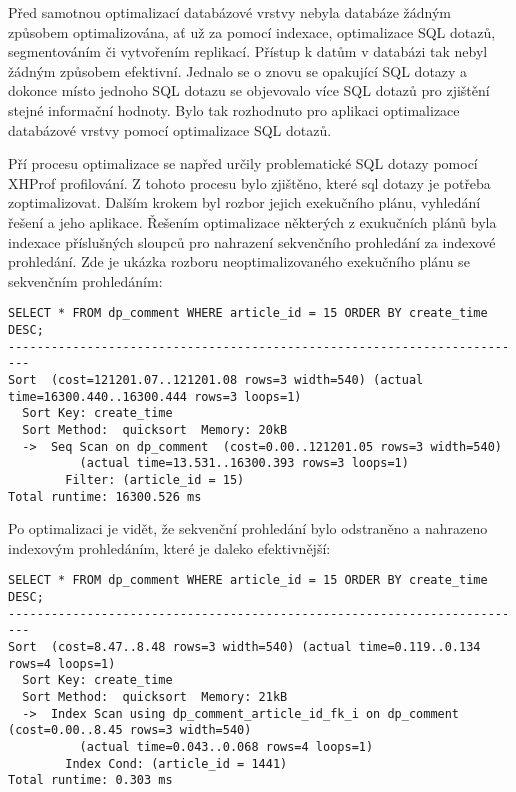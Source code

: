 \documentclass[12pt]{article}
\begin{document}
\label{sec:optim-database}
Před samotnou optimalizací databázové vrstvy nebyla databáze žádným způsobem optimalizována, ať už za pomocí indexace, optimalizace SQL dotazů, segmentováním či vytvořením replikací. Přístup k datům v databázi tak nebyl žádným způsobem efektivní. Jednalo se o znovu se opakující SQL dotazy a dokonce místo jednoho SQL dotazu se objevovalo více SQL dotazů pro zjištění stejné informační hodnoty. Bylo tak rozhodnuto pro aplikaci optimalizace databázové vrstvy pomocí optimalizace SQL dotazů.

Pří procesu optimalizace se napřed určily problematické SQL dotazy pomocí XHProf profilování. Z tohoto procesu bylo zjištěno, které sql dotazy je potřeba zoptimalizovat. Dalším krokem byl rozbor jejich exekučního plánu, vyhledání řešení a jeho aplikace. Řešením optimalizace některých z exukučních plánů byla indexace příslušných sloupců pro nahrazení sekvenčního prohledání za indexové prohledání. Zde je ukázka rozboru neoptimalizovaného exekučního plánu se sekvenčním prohledáním:

\begin{scriptsize}
\begin{verbatim}
SELECT * FROM dp_comment WHERE article_id = 15 ORDER BY create_time DESC;
-------------------------------------------------------------------------
Sort  (cost=121201.07..121201.08 rows=3 width=540) (actual time=16300.440..16300.444 rows=3 loops=1)
  Sort Key: create_time
  Sort Method:  quicksort  Memory: 20kB
  ->  Seq Scan on dp_comment  (cost=0.00..121201.05 rows=3 width=540) 
          (actual time=13.531..16300.393 rows=3 loops=1)
        Filter: (article_id = 15)
Total runtime: 16300.526 ms
\end{verbatim}
\end{scriptsize}

Po optimalizaci je vidět, že sekvenční prohledání bylo odstraněno a nahrazeno indexovým prohledáním, které je daleko efektivnější:

\begin{scriptsize}
\begin{verbatim}
SELECT * FROM dp_comment WHERE article_id = 15 ORDER BY create_time DESC;
-------------------------------------------------------------------------
Sort  (cost=8.47..8.48 rows=3 width=540) (actual time=0.119..0.134 rows=4 loops=1)
  Sort Key: create_time
  Sort Method:  quicksort  Memory: 21kB
  ->  Index Scan using dp_comment_article_id_fk_i on dp_comment  (cost=0.00..8.45 rows=3 width=540) 
          (actual time=0.043..0.068 rows=4 loops=1)
        Index Cond: (article_id = 1441)
Total runtime: 0.303 ms
\end{verbatim}
\end{scriptsize}
\end{document}
